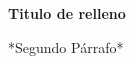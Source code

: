 \documentclass[12pt]{article}
\begin{document}
    \begin{center}
        \textbf{Titulo de relleno}
    \end{center}

    \noindent 
    
    *Segundo Párrafo*

    \lipsum

\end{document}
